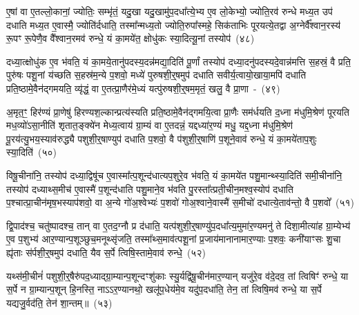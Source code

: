 {\anuvakamend[{ए॒ष वै प॒शुर्यम॑सर्पदे॒ष यत्तस्मा॒त्तस्मा᳚थ्स॒प्तविꣳ॑शतिश्च}]}

ए॒षां वा ए॒तल्लो॒कानां॒ ज्योतिः॒ सम्भृ॑तं॒ यदु॒खा यदु॒खामु॑प॒दधा᳚त्ये॒भ्य ए॒व लो॒केभ्यो॒ ज्योति॒रव॑ रुन्धे मध्य॒त उप॑ दधाति मध्य॒त ए॒वास्मै॒ ज्योति॑र्दधाति॒ तस्मा᳚न्मध्य॒तो ज्योति॒रुपा᳚स्महे॒ सिक॑ताभिः पूरयत्ये॒तद्वा अ॒ग्नेर्वै᳚श्वान॒रस्य॑ रू॒पꣳ रू॒पेणै॒व वै᳚श्वान॒रमव॑ रुन्धे॒ यं का॒मये॑त॒ क्षोधु॑कः स्या॒दित्यू॒नां तस्योप॑~(४८)\ip

दध्या॒त्क्षोधु॑क ए॒व भ॑वति॒ यं का॒मये॒तानु॑पदस्य॒दन्न॑मद्या॒दिति॑ पू॒र्णां तस्योप॑ दध्या॒दनु॑पदस्यदे॒वान्न॑मत्ति स॒हस्रं॒ वै प्रति॒ पुरु॑षः पशू॒नां य॑च्छति स॒हस्र॑म॒न्ये प॒शवो॒ मध्ये॑ पुरुषशी॒र्॒\mbox{}षमुप॑ दधाति सवीर्य॒त्वायो॒खाया॒मपि॑ दधाति प्रति॒ष्ठामे॒वैन॑द्गमयति॒ व्यृ॑द्धं॒ वा ए॒तत्प्रा॒णैर॑मे॒ध्यं यत्पु॑रुषशी॒र्॒\mbox{}षम॒मृतं॒ खलु॒ वै प्रा॒णा~-~(४९)\ip

अ॒मृत॒ꣳ॒ हिर॑ण्यं प्रा॒णेषु॑ हिरण्यश॒ल्कान्प्रत्य॑स्यति प्रति॒ष्ठामे॒वैन॑द्गमयि॒त्वा प्रा॒णैः सम॑र्धयति द॒ध्ना म॑धुमि॒श्रेण॑ पूरयति मध॒व्यो॑\-ऽसा॒नीति॑ शृतात॒ङ्क्ये॑न मेध्य॒त्वाय॑ ग्रा॒म्यं वा ए॒तदन्नं॒ यद्दध्या॑र॒ण्यं मधु॒ यद्द॒ध्ना म॑धुमि॒श्रेण॑ पू॒रय॑त्यु॒भय॒स्याव॑रुद्ध्यै पशुशी॒र्॒\mbox{}षाण्युप॑ दधाति प॒शवो॒ वै प॑शुशी॒र्॒\mbox{}षाणि॑ प॒शूने॒वाव॑ रुन्धे॒ यं का॒मये॑ताप॒शुः स्या॒दिति॑~(५०)\ip

विषू॒चीना॑नि॒ तस्योप॑ दध्या॒द्विषू॑च ए॒वास्मा᳚त्प॒शून्द॑धात्यप॒शुरे॒व भ॑वति॒ यं का॒मये॑त पशु॒मान्थ्स्या॒दिति॑ समी॒चीना॑नि॒ तस्योप॑ दध्याथ्स॒मीच॑ ए॒वास्मै॑ प॒शून्द॑धाति पशु॒माने॒व भ॑वति पु॒रस्ता᳚त्प्रती॒चीन॒मश्व॒स्योप॑ दधाति प॒श्चात्प्रा॒चीन॑मृष॒भस्याप॑शवो॒ वा अ॒न्ये गो॑अ॒श्वेभ्यः॑ प॒शवो॑ गोअ॒श्वाने॒वास्मै॑ स॒मीचो॑ दधात्ये॒ताव॑न्तो॒ वै प॒शवो᳚~(५१)\ip

द्वि॒पाद॑श्च॒ चतु॑ष्पादश्च॒ तान् वा ए॒तद॒ग्नौ प्र द॑धाति॒ यत्प॑शुशी॒र्॒\mbox{}षाण्यु॑प॒दधा᳚त्य॒मुमा॑र॒ण्यमनु॑ ते दिशा॒मीत्या॑ह ग्रा॒म्येभ्य॑ ए॒व प॒शुभ्य॑ आर॒ण्यान्प॒शूञ्छुच॒मनूथ्सृ॑जति॒ तस्मा᳚थ्स॒माव॑त्पशू॒नां प्र॒जाय॑मानानामार॒ण्याः प॒शवः॒ कनी॑याꣳसः शु॒चा ह्यृ॑ताः स॑र्पशी॒र्॒\mbox{}षमुप॑ दधाति॒ यैव स॒र्पे त्विषि॒स्तामे॒वाव॑ रुन्धे॒~(५२)\ip

यथ्स॑मी॒चीनं॑ पशुशी॒र्॒\mbox{}षैरु॑पद॒ध्याद्ग्रा॒म्यान्प॒शून्दꣳशु॑काः स्यु॒र्यद्वि॑षू॒चीन॑मार॒ण्यान् यजु॑रे॒व व॑दे॒दव॒ तां त्विषिꣳ॑ रुन्धे॒ या स॒र्पे न ग्रा॒म्यान्प॒शून् हि॒नस्ति॒ ना\-ऽऽर॒ण्यानथो॒ खलू॑प॒धेय॑मे॒व यदु॑प॒\-दधा॑ति॒ तेन॒ तां त्विषि॒मव॑ रुन्धे॒ या स॒र्पे यद्यजु॒र्वद॑ति॒ तेन॑ शा॒न्तम्॥~(५३)\ip

{\anuvakamend[{ऊ॒नान्तस्योप॑ प्रा॒णाः स्या॒दिति॒ वै प॒शवो॑ रुन्धे॒ चतु॑श्चत्वारिꣳशच्च}]}

